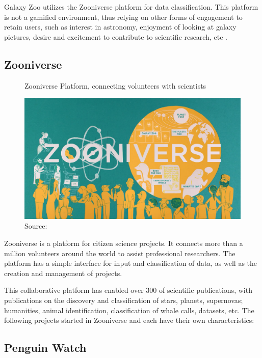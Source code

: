 Galaxy Zoo utilizes the Zooniverse platform for data classification. This platform is not a gamified environment, thus relying on other forms of engagement to retain users, such as interest in astronomy, enjoyment of looking at galaxy pictures, desire and excitement to contribute to scientific research, etc \cite{raddick2009galaxy}.

\subsection{Zooniverse}

\begin{figure}[ht]
    \centering
    \caption{Zooniverse Platform, connecting volunteers with scientists}
    \includegraphics[width=0.7\linewidth]{images/background/zooniverse.jpg}
    \caption*{Source: \cite{zooniverse-logo}}
    \label{fig:foldit-solution}
\end{figure}

Zooniverse is a platform for citizen science projects. It connects more than a million volunteers around the world to assist professional researchers. The platform has a simple interface for input and classification of data, as well as the creation and management of projects.

This collaborative platform has enabled over 300 of scientific publications, with publications on the discovery and classification of stars, planets, supernovas; humanities, animal identification, classification of whale calls, datasets, etc. The following projects started in Zooniverse and each have their own characteristics:

\subsection{Penguin Watch}

